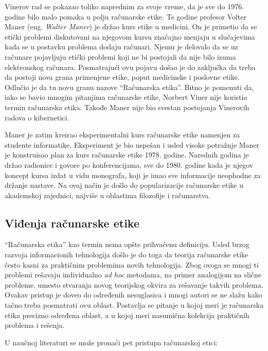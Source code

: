 \documentclass[a4paper]{article}
\begin{document}
Vinerov rad se pokazao toliko naprednim za svoje vreme, da je sve do 1976. godine bilo malo pomaka u polju računarske etike. Te godine profesor Volter Maner (eng. \textit{Walter Maner}) je držao kurs etike u medicini. On je primetio da se etički problemi diskutovani na njegovom kursu značajno menjaju u slučajevima kada se u postavku problema dodaju računari. Njemu je delovalo da se uz računare pojavljuju etički problemi koji ne bi postojali da nije bilo izuma elektronskog računara. Posmatrajući ovu pojavu došao je do zaključka da treba da postoji nova grana primenjene etike, poput medicinske i poslovne etike. Odlučio je da tu novu granu nazove ``Računarska etika''. Bitno je pomenuti da, iako se bavio mnogim pitanjima računarske etike, Norbert Viner nije koristio termin računarska etika. Takođe Maner nije bio svestan postojanja Vinerovih radova o kibernetici.

Maner je zatim kreirao eksperimentalni kurs računarske etike namenjen za studente informatike. Eksperiment je bio uspešan i usled visoke potražnje Maner je konstruisao plan za kurs računarske etike 1978. godine. Narednih godina je držao radionice i govore po konferencijama, sve do 1980. godine kada je njegov koncept kursa izdat u vidu monografa, koji je imao sve informacije neophodne za držanje nastave. Na ovaj način je došlo do popularizacije računarske etike u akademskoj zajednici, najviše u oblastima filozofije i računarstva.



\subsection{Viđenja računarske etike}
``Računarska etika'' kao termin nema opšte prihvaćenu definiciju. Usled brzog razvoja informacionih tehnologija došlo je do toga da teorija računarske etike često kasni za praktičnim problemima novih tehnologija. Zbog ovoga se mnogi ti problemi rešavaju individualno \textit{ad hoc} metodama, na primer analogijom na slične probleme, umesto stvaranja novog teorijskog okvira za rešavanje takvih problema. Ovakav pristup je doveo do određenih nesuglasica i mnogi autori se ne slažu kako tačno treba posmatrati ovu oblast. Postavlja se pitanje u kojoj meri je računarska etika precizno određena oblast, a u kojoj meri nasumična kolekcija praktičnih problema i rešenja.

U naučnoj literaturi se može pronaći pet pristupa računarskoj etici\cite{floridi}:
\end{document}
